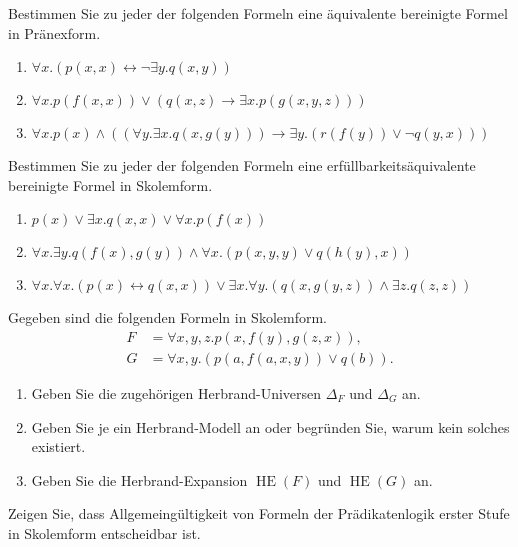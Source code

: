 \documentclass[german]{latteachCD}[2017/03/28]
\begin{document}
\begin{exercise}
  Bestimmen Sie zu jeder der folgenden Formeln eine äquivalente bereinigte
  Formel in Pränexform.
  \begin{enumerate}
  \item $\forall x.(p(x,x) \leftrightarrow \lnot \exists y.q(x,y))$
  \item $\forall x.p(f(x,x)) \lor (q(x,z) \to \exists x.p(g(x,y,z)))$
  \item $\forall x.p(x) \land ((\forall y.\exists x.q(x,g(y))) \to \exists
    y.(r(f(y)) \lor \lnot q(y,x)))$
  \end{enumerate}
\end{exercise}

\newpage

\begin{exercise}
  Bestimmen Sie zu jeder der folgenden Formeln eine erfüllbarkeitsäquivalente
  bereinigte Formel in Skolemform.
  \begin{enumerate}
  \item $p(x) \lor \exists x.q(x,x) \lor \forall x.p(f(x))$
  \item $\forall x.\exists y.q(f(x),g(y)) \land \forall x.(p(x,y,y) \lor
    q(h(y),x))$
  \item $\forall x.\forall x.(p(x) \leftrightarrow q(x,x)) \lor \exists
    x.\forall y.(q(x,g(y,z)) \land \exists z.q(z,z))$
  \end{enumerate}
\end{exercise}


\begin{exercise}
  Gegeben sind die folgenden Formeln in Skolemform.
  \begin{align*}
    F &= \forall x, y, z. p(x,f(y),g(z,x)),\\
    G &= \forall x,y. (p(a,f(a,x,y)) \lor q(b)).
  \end{align*}
  \begin{enumerate}
  \item Geben Sie die zugehörigen Herbrand-Universen $\Delta_{F}$ und
    $\Delta_{G}$ an.
  \item Geben Sie je ein Herbrand-Modell an oder begründen Sie, warum kein
    solches existiert.
  \item Geben Sie die Herbrand-Expansion $\operatorname{HE}(F)$ und
    $\operatorname{HE}(G)$ an.
  \end{enumerate}
\end{exercise}

\begin{exercise}
  Zeigen Sie, dass Allgemeingültigkeit von Formeln der Prädikatenlogik erster
  Stufe in Skolemform entscheidbar ist.
\end{exercise}
\end{document}
